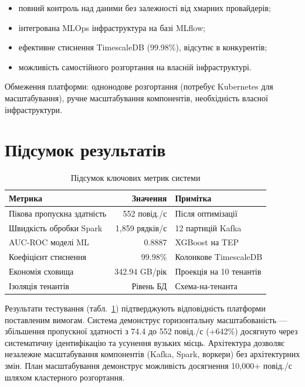 \begin{itemize}
    \item повний контроль над даними без залежності від хмарних провайдерів;
    \item інтегрована MLOps інфраструктура на базі MLflow;
    \item ефективне стиснення TimescaleDB (99.98\%), відсутнє в конкурентів;
    \item можливість самостійного розгортання на власній інфраструктурі.
\end{itemize}

Обмеження платформи: однонодове розгортання (потребує Kubernetes для масштабування), ручне масштабування компонентів, необхідність власної інфраструктури.

\section{Підсумок результатів}

\begin{table}[h]
\caption{Підсумок ключових метрик системи}
\label{tab:key_metrics_summary}
\begin{tabular}{@{}lrl@{}}
\toprule
Метрика & Значення & Примітка \\
\midrule
Пікова пропускна здатність & 552 повід./с & Після оптимізації \\
Швидкість обробки Spark & 1,859 рядків/с & 12 партицій Kafka \\
AUC-ROC моделі ML & 0.8887 & XGBoost на TEP \\
Коефіцієнт стиснення & 99.98\% & Колонкове TimescaleDB \\
Економія сховища & 342.94 GB/рік & Проекція на 10 тенантів \\
Ізоляція тенантів & Рівень БД & Схема-на-тенанта \\
\bottomrule
\end{tabular}
\end{table}

Результати тестування (табл.~\ref{tab:key_metrics_summary}) підтверджують відповідність платформи поставленим вимогам. Система демонструє горизонтальну масштабованість --- збільшення пропускної здатності з 74.4 до 552 повід./с (+642\%) досягнуто через систематичну ідентифікацію та усунення вузьких місць. Архітектура дозволяє незалежне масштабування компонентів (Kafka, Spark, воркери) без архітектурних змін. План масштабування демонструє можливість досягнення 10,000+ повід./с шляхом кластерного розгортання.

